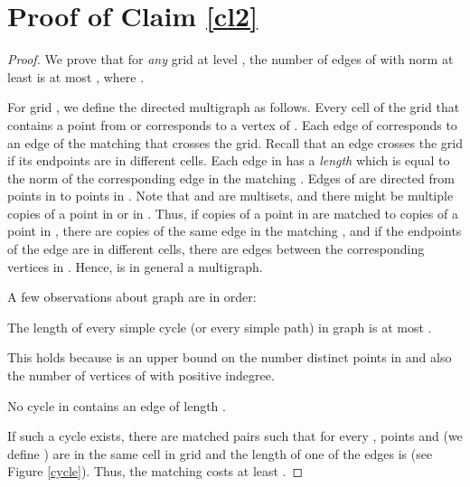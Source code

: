 \documentclass[oribibl]{llncs}
\begin{document}
\section{Proof of Claim \ref{cl2}}
\begin{proof}
We prove that for \textit{any} grid  at level , the number of
edges of  with  norm at least  is at most ,
where .

For grid , we define the directed multigraph  as follows. Every
cell  of the grid that contains a point from  or  corresponds to a
vertex of .
Each edge of  corresponds to an edge of the matching  that crosses
the grid. Recall that an edge crosses the grid if its endpoints are in different
cells. Each edge in  has a \textit{length} which is equal to the
 norm of the corresponding edge in the matching .
Edges of  are directed from points in  to points in
. Note that  and  are multisets, and there might be multiple copies of
a point in  or in .
Thus, if  copies of a point in  are matched to
 copies of a point in , there are  copies of the same edge in the
matching , and if the endpoints of the edge are in different cells,
there are  edges between the corresponding vertices in . Hence,
 is in general a multigraph.

A few observations about graph  are in order:
\begin{observation}\label{obs1}
 The length of every simple cycle (or every simple path) in graph 
is at most .
\end{observation}
This holds because  is an upper bound on the number distinct points in 
and also the number of vertices of  with positive indegree.
\begin{observation}\label{obs2}
No cycle in  contains an edge of length . 
\end{observation}
If such a cycle exists, there are
matched pairs 
 such that
for every , points  and 
(we define ) are in the same cell in grid 
and the length of one of the edges is 
(see Figure \ref{cycle}).
Thus, the matching  costs at least .



\end{proof}
\end{document}
